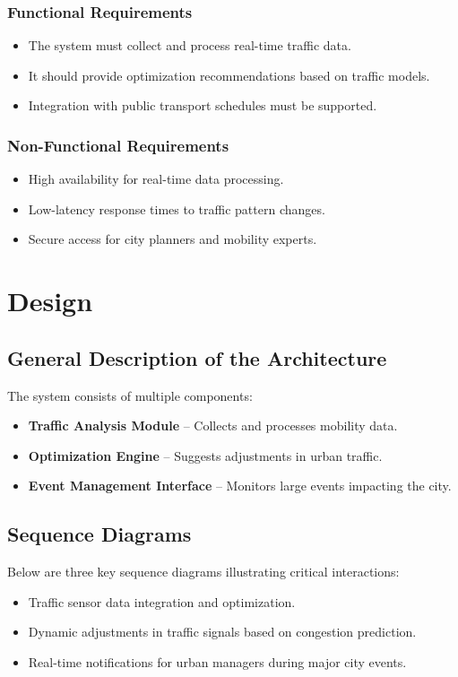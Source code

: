 \documentclass[a4paper,12pt]{article}
\begin{document}
\subsubsection{Functional Requirements}
\begin{itemize}
    \item The system must collect and process real-time traffic data.
    \item It should provide optimization recommendations based on traffic models.
    \item Integration with public transport schedules must be supported.
\end{itemize}

\subsubsection{Non-Functional Requirements}
\begin{itemize}
    \item High availability for real-time data processing.
    \item Low-latency response times to traffic pattern changes.
    \item Secure access for city planners and mobility experts.
\end{itemize}

\newpage

\section{Design}
\subsection{General Description of the Architecture}
The system consists of multiple components:
\begin{itemize}
    \item \textbf{Traffic Analysis Module} – Collects and processes mobility data.
    \item \textbf{Optimization Engine} – Suggests adjustments in urban traffic.
    \item \textbf{Event Management Interface} – Monitors large events impacting the city.
\end{itemize}

\subsection{Sequence Diagrams}
Below are three key sequence diagrams illustrating critical interactions:
\begin{itemize}
    \item Traffic sensor data integration and optimization.
    \item Dynamic adjustments in traffic signals based on congestion prediction.
    \item Real-time notifications for urban managers during major city events.
\end{itemize}
\end{document}
